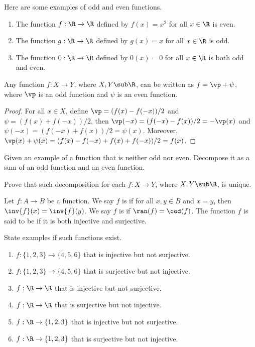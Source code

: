 \documentclass[10pt]{article}
\begin{document}
\begin{example}
    Here are some examples of odd and even functions.
    \begin{enumerate}
        \item The function $f:\R\to\R$ defined by $f(x)={x}^{2}$ for all $x\in\R$ is even.
        \item The function $g:\R\to\R$ defined by $g(x)=x$ for all $x\in\R$ is odd.
        \item The function $0:\R\to\R$ defined by $0(x)=0$ for all $x\in\R$ is both odd and even.
    \end{enumerate}
\end{example}
\begin{proposition}
    Any function $f:X\to Y$, where $X,Y\sub\R$, can be written as $f=\vp+\psi$, where $\vp$ is an odd function and $\psi$ is an even function.
\end{proposition}
\begin{proof}
    For all $x\in X$, define $\vp=(f(x)-f(-x))/2$ and $\psi=(f(x)+f(-x))/2$, then $\vp(-x)=(f(-x)-f(x))/2=-\vp(x)$ and $\psi(-x)=(f(-x)+f(x))/2=\psi(x)$. Moreover, $\vp(x)+\psi(x)=(f(x)-f(-x)+f(x)+f(-x))/2=f(x)$.
\end{proof}
\begin{problem}
    Given an example of a function that is neither odd nor even. Decompose it as a sum of an odd function and an even function.
\end{problem}
\begin{problem}
    Prove that such decomposition for each $f:X\to Y$, where $X,Y\sub\R$, is unique.
\end{problem}
\begin{definition}
    Let $f:A\to B$ be a function. We say $f$ is  if for all $x,y\in B$ and $x=y$, then $\inv{f}(x)=\inv{f}(y)$. We say $f$ is  if $\ran(f)=\cod(f)$. The function $f$ is said to be  if it is both injective and surjective.
\end{definition}
\begin{problem}
    State examples if such functions exist.
    \begin{enumerate}
        \item $f:\{1,2,3\}\to\{4,5,6\}$ that is injective but not surjective.
        \item $f:\{1,2,3\}\to\{4,5,6\}$ that is surjective but not injective.
        \item $f:\R\to\R$ that is injective but not surjective.
        \item $f:\R\to\R$ that is surjective but not injective.
        \item $f:\R\to\{1,2,3\}$ that is injective but not surjective.
        \item $f:\R\to\{1,2,3\}$ that is surjective but not injective.
    \end{enumerate}
\end{problem}
\end{document}
